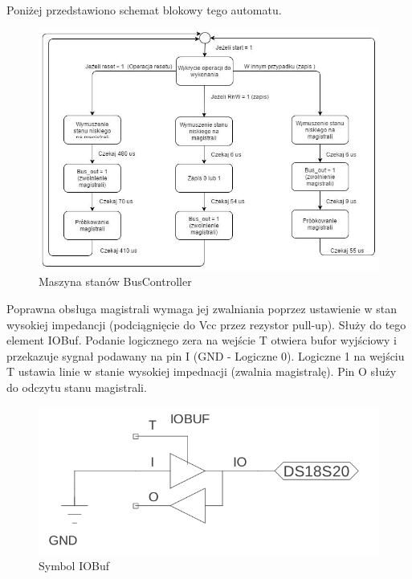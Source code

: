\documentclass[a4paper]{article}
\begin{document}
Poniżej przedstawiono schemat blokowy tego automatu.

\begin{figure}[!h]
\begin{center}
\includegraphics[width=15cm]{graphics/bus_controller_fsm.png}
\end{center}
\label{bus_controller_fsm}
\caption{Maszyna stanów BusController}
\end{figure}

Poprawna obsługa magistrali wymaga jej zwalniania poprzez ustawienie w stan wysokiej impedancji (podciągnięcie do Vcc przez rezystor pull-up). Służy do tego element IOBuf. Podanie logicznego zera na wejście T otwiera bufor wyjściowy i przekazuje sygnał podawany na pin I (GND - Logiczne 0). Logiczne 1 na wejściu T ustawia linie w stanie wysokiej impednacji (zwalnia magistralę). Pin O służy do odczytu stanu magistrali.

\begin{figure}[!h]
\begin{center}
\includegraphics[scale=1.4]{graphics/io_buf_sym.png}
\end{center}
\label{bus_controller_sym}
\caption{Symbol IOBuf}
\end{figure}
\end{document}
